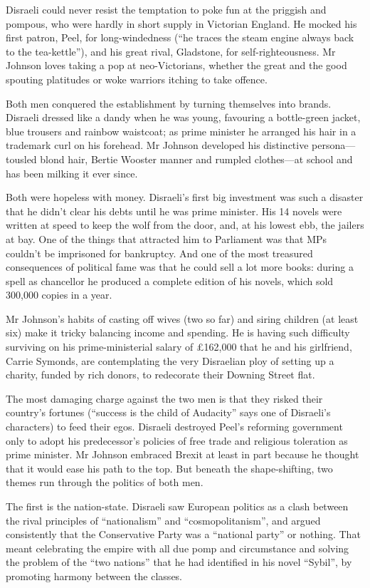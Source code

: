 \documentclass{article}
\begin{document}
Disraeli could never resist the temptation to poke fun at the priggish and pompous, who were hardly in short supply in Victorian England. He mocked his first patron, Peel, for long-windedness (``he traces the steam engine always back to the tea-kettle''), and his great rival, Gladstone, for self-righteousness. Mr Johnson loves taking a pop at neo-Victorians, whether the great and the good spouting platitudes or woke warriors itching to take offence. 

Both men conquered the establishment by turning themselves into brands. Disraeli dressed like a dandy when he was young, favouring a bottle-green jacket, blue trousers and rainbow waistcoat; as prime minister he arranged his hair in a trademark curl on his forehead. Mr Johnson developed his distinctive persona---tousled blond hair, Bertie Wooster manner and rumpled clothes---at school and has been milking it ever since. 

Both were hopeless with money. Disraeli's first big investment was such a disaster that he didn't clear his debts until he was prime minister. His 14 novels were written at speed to keep the wolf from the door, and, at his lowest ebb, the jailers at bay. One of the things that attracted him to Parliament was that MPs couldn't be imprisoned for bankruptcy. And one of the most treasured consequences of political fame was that he could sell a lot more books: during a spell as chancellor he produced a complete edition of his novels, which sold 300,000 copies in a year. 

Mr Johnson's habits of casting off wives (two so far) and siring children (at least six) make it tricky balancing income and spending. He is having such difficulty surviving on his prime-ministerial salary of £162,000 that he and his girlfriend, Carrie Symonds, are contemplating the very Disraelian ploy of setting up a charity, funded by rich donors, to redecorate their Downing Street flat. 

The most damaging charge against the two men is that they risked their country's fortunes (``success is the child of Audacity'' says one of Disraeli's characters) to feed their egos. Disraeli destroyed Peel's reforming government only to adopt his predecessor's policies of free trade and religious toleration as prime minister. Mr Johnson embraced Brexit at least in part because he thought that it would ease his path to the top. But beneath the shape-shifting, two themes run through the politics of both men. 

The first is the nation-state. Disraeli saw European politics as a clash between the rival principles of ``nationalism'' and ``cosmopolitanism'', and argued consistently that the Conservative Party was a ``national party'' or nothing. That meant celebrating the empire with all due pomp and circumstance and solving the problem of the ``two nations'' that he had identified in his novel ``Sybil'', by promoting harmony between the classes. 
\end{document}
